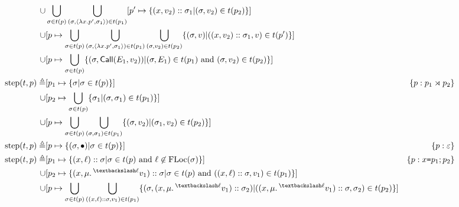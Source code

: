 \documentclass{article}
\begin{document}
\begin{align*}
  \cup                       & \bigcup_{\ctx\in \ptree(p)}\bigcup_{(\ctx,\langle\lambda x.p',\ctx_1\rangle)\in \ptree(p_1)}[p'\mapsto\{(x,v_2)\cons\ctx_1|(\ctx,v_2)\in \ptree(p_2)\}]                                                                                                                  \\
  \cup                       & [p\mapsto\bigcup_{\ctx\in \ptree(p)}\bigcup_{(\ctx,\langle\lambda x.p',\ctx_1\rangle)\in \ptree(p_1)}\bigcup_{(\ctx,v_2)\in \ptree(p_2)}\{(\ctx,v)|((x,v_2)\cons\ctx_1,v)\in \ptree(p')\}]                                                                               \\
  \cup                       & [p\mapsto\bigcup_{\ctx\in \ptree(p)}\{(\ctx,\CallE(\event_1,v_2))|(\ctx,\event_1)\in \ptree(p_1)\text{ and }(\ctx,v_2)\in \ptree(p_2)\}]                                                                                                                                 \\
  \step(\ptree,p) \triangleq & [p_1\mapsto\{\ctx|\ctx\in \ptree(p)\}]                                                                                                                                                                & \plabel{p}{\link{p_1}{p_2}}                                      \\
  \cup                       & [p_2\mapsto\bigcup_{\ctx\in \ptree(p)}\{\ctx_1|(\ctx,\ctx_1)\in \ptree(p_1)\}]                                                                                                                                                                                           \\
  \cup                       & [p\mapsto\bigcup_{\ctx\in \ptree(p)}\bigcup_{(\ctx,\ctx_1)\in \ptree(p_1)}\{(\ctx,v_2)|(\ctx_1,v_2)\in \ptree(p_2)\}]                                                                                                                                                    \\
  \step(\ptree,p) \triangleq & [p\mapsto\{(\ctx,\bullet)|\ctx\in \ptree(p)\}]                                                                                                                                                        & \plabel{p}{\varepsilon}                                          \\
  \step(\ptree,p) \triangleq & [p_1\mapsto\{(x,\ell)\cons\ctx|\ctx\in \ptree(p)\text{ and }\ell\not\in\FLoc(\ctx)\}]                                                                                                                 & \plabel{p}{x\texttt{=}p_1;p_2}                                   \\
  \cup                       & [p_2\mapsto\{(x,\mu.\closeloc{\ell}{v_1})\cons\ctx|\ctx\in \ptree(p)\text{ and }((x,\ell)\cons\ctx,v_1)\in \ptree(p_1)\}]                                                                                                                                                \\
  \cup                       & [p\mapsto\bigcup_{\ctx\in \ptree(p)}\bigcup_{((x,\ell)\cons\ctx,v_1)\in \ptree(p_1)}\{(\ctx,(x,\mu.\closeloc{\ell}{v_1})\cons\ctx_2)|((x,\mu.\closeloc{\ell}{v_1})\cons\ctx,\ctx_2)\in \ptree(p_2)\}]
\end{align*}
\end{document}
